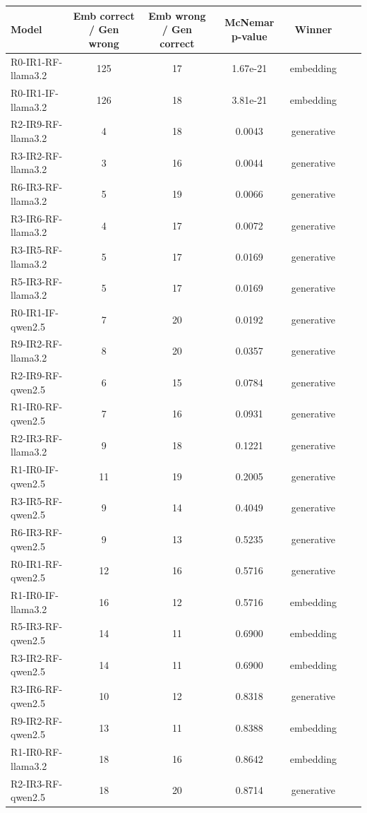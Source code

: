 \begin{tabular}{lcccccc}
\toprule
Model & Emb correct / Gen wrong & Emb wrong / Gen correct & McNemar p-value & Winner \\
\midrule
R0-IR1-RF-llama3.2 & 125 & 17 & 1.67e-21 & embedding \\
R0-IR1-IF-llama3.2 & 126 & 18 & 3.81e-21 & embedding \\
R2-IR9-RF-llama3.2 & 4 & 18 & 0.0043 & generative \\
R3-IR2-RF-llama3.2 & 3 & 16 & 0.0044 & generative \\
R6-IR3-RF-llama3.2 & 5 & 19 & 0.0066 & generative \\
R3-IR6-RF-llama3.2 & 4 & 17 & 0.0072 & generative \\
R3-IR5-RF-llama3.2 & 5 & 17 & 0.0169 & generative \\
R5-IR3-RF-llama3.2 & 5 & 17 & 0.0169 & generative \\
R0-IR1-IF-qwen2.5 & 7 & 20 & 0.0192 & generative \\
R9-IR2-RF-llama3.2 & 8 & 20 & 0.0357 & generative \\
R2-IR9-RF-qwen2.5 & 6 & 15 & 0.0784 & generative \\
R1-IR0-RF-qwen2.5 & 7 & 16 & 0.0931 & generative \\
R2-IR3-RF-llama3.2 & 9 & 18 & 0.1221 & generative \\
R1-IR0-IF-qwen2.5 & 11 & 19 & 0.2005 & generative \\
R3-IR5-RF-qwen2.5 & 9 & 14 & 0.4049 & generative \\
R6-IR3-RF-qwen2.5 & 9 & 13 & 0.5235 & generative \\
R0-IR1-RF-qwen2.5 & 12 & 16 & 0.5716 & generative \\
R1-IR0-IF-llama3.2 & 16 & 12 & 0.5716 & embedding \\
R5-IR3-RF-qwen2.5 & 14 & 11 & 0.6900 & embedding \\
R3-IR2-RF-qwen2.5 & 14 & 11 & 0.6900 & embedding \\
R3-IR6-RF-qwen2.5 & 10 & 12 & 0.8318 & generative \\
R9-IR2-RF-qwen2.5 & 13 & 11 & 0.8388 & embedding \\
R1-IR0-RF-llama3.2 & 18 & 16 & 0.8642 & embedding \\
R2-IR3-RF-qwen2.5 & 18 & 20 & 0.8714 & generative \\
\bottomrule
\end{tabular}
